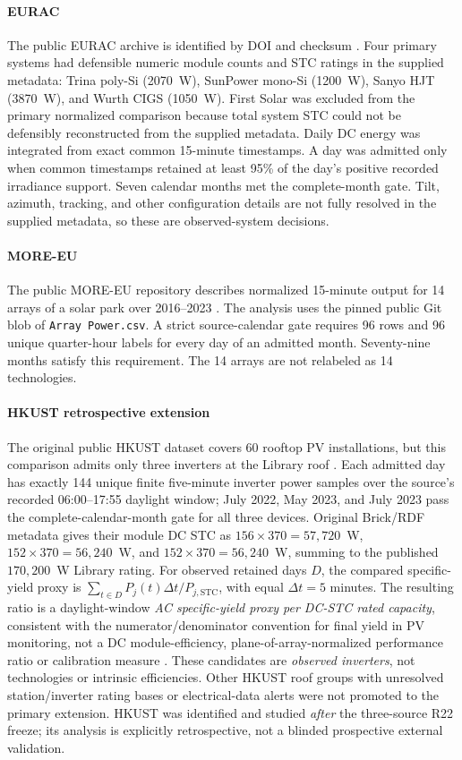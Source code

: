 \documentclass[preprint,12pt]{elsarticle}
\begin{document}
\paragraph{EURAC} The public EURAC archive is identified by DOI and checksum \cite{eurac2026}. Four primary systems had defensible numeric module counts and STC ratings in the supplied metadata: Trina poly-Si (2070~W), SunPower mono-Si (1200~W), Sanyo HJT (3870~W), and Wurth CIGS (1050~W). First Solar was excluded from the primary normalized comparison because total system STC could not be defensibly reconstructed from the supplied metadata. Daily DC energy was integrated from exact common 15-minute timestamps. A day was admitted only when common timestamps retained at least 95\% of the day's positive recorded irradiance support. Seven calendar months met the complete-month gate. Tilt, azimuth, tracking, and other configuration details are not fully resolved in the supplied metadata, so these are observed-system decisions.

\paragraph{MORE-EU} The public MORE-EU repository describes normalized 15-minute output for 14 arrays of a solar park over 2016--2023 \cite{moreeu2026}. The analysis uses the pinned public Git blob of \texttt{Array Power.csv}. A strict source-calendar gate requires 96 rows and 96 unique quarter-hour labels for every day of an admitted month. Seventy-nine months satisfy this requirement. The 14 arrays are not relabeled as 14 technologies.

\paragraph{HKUST retrospective extension} The original public HKUST dataset covers 60 rooftop PV installations, but this comparison admits only three inverters at the Library roof \cite{lin2025,hkust2024}. Each admitted day has exactly 144 unique finite five-minute inverter power samples over the source's recorded 06:00--17:55 daylight window; July 2022, May 2023, and July 2023 pass the complete-calendar-month gate for all three devices. Original Brick/RDF metadata gives their module DC STC as $156\times370=57{,}720$~W, $152\times370=56{,}240$~W, and $152\times370=56{,}240$~W, summing to the published $170{,}200$~W Library rating. For observed retained days $D$, the compared specific-yield proxy is $\sum_{t\in D}P_j(t)\Delta t/P_{j,\mathrm{STC}}$, with equal $\Delta t=5$ minutes. The resulting ratio is a daylight-window \emph{AC specific-yield proxy per DC-STC rated capacity}, consistent with the numerator/denominator convention for final yield in PV monitoring, not a DC module-efficiency, plane-of-array-normalized performance ratio or calibration measure \cite{iec61724_2021}. These candidates are \emph{observed inverters}, not technologies or intrinsic efficiencies. Other HKUST roof groups with unresolved station/inverter rating bases or electrical-data alerts were not promoted to the primary extension. HKUST was identified and studied \emph{after} the three-source R22 freeze; its analysis is explicitly retrospective, not a blinded prospective external validation.
\end{document}
